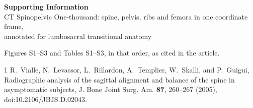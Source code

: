 \documentclass[aapm,mph,amsmath,amssymb,reprint]{revtex4-2}
\begin{document}
\onecolumngrid
\begin{center}
{\large\bfseries Supporting Information}\\[3pt]
CT Spinopelvic One-thousand: spine, pelvis, ribs and femora in one coordinate frame,\\
annotated for lumbosacral transitional anatomy
\end{center}
\vspace{6pt}
\renewcommand{\figurename}{Figure}
\renewcommand{\tablename}{Table}
\noindent Figures S1--S3 and Tables S1--S3, in that order, as cited in the article.
\vspace{6pt}



\begin{thebibliography}{1}
R.~Vialle, N.~Levassor, L.~Rillardon, A.~Templier, W.~Skalli, and P.~Guigui,
\newblock Radiographic analysis of the sagittal alignment and balance of the spine in asymptomatic subjects,
\newblock J. Bone Joint Surg. Am. {\bf 87}, 260--267 (2005),
\newblock doi:10.2106/JBJS.D.02043.
\end{thebibliography}
\end{document}

